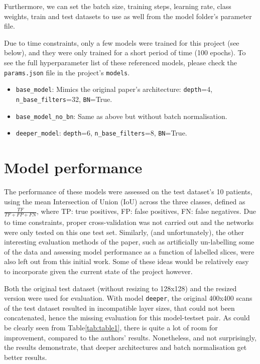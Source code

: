 \documentclass{article}
\begin{document}
Furthermore, we can set the batch size, training steps, learning rate, class weights, train and test datasets to use as well from the model folder's parameter file.

Due to time constraints, only a few models were trained for this project (see below), and they were only trained for a short period of time (100 epochs). To see the full hyperparameter list of these referenced models, please check the \texttt{params.json} file in the project's \texttt{models}. 

\begin{itemize}
	\item \texttt{base\_model}: Mimics the original paper's architecture: \texttt{depth}=4, \texttt{n\_base\_filters}=32, \texttt{BN}=True.
	\item \texttt{base\_model\_no\_bn}: Same as above but without batch normalisation. 
	\item \texttt{deeper\_model}: \texttt{depth}=6, \texttt{n\_base\_filters}=8, \texttt{BN}=True.
\end{itemize}



\section{Model performance}

The performance of these models were assessed on the test dataset's 10 patients, using the mean Intersection of Union (IoU) across the three classes, defined as $\frac{TF}{TF + FP + FN}$, where TP: true positives, FP: false positives, FN: false negatives. Due to  time constraints, proper cross-validation was not carried out and the networks were only tested on this one test set. Similarly, (and unfortunately), the other interesting evaluation methods of the paper, such as artificially un-labelling some of the data and assessing model performance as a function of labelled slices, were also left out from this initial work. Some of these ideas would be relatively easy to incorporate given the current state of the project however.

Both the original test dataset (without resizing to 128x128) and the resized version were used for evaluation. With model \texttt{deeper}, the original 400x400 scans of the test dataset resulted in incompatible layer sizes, that could not been concatenated, hence the missing evaluation for this model-testset pair. As could be clearly seen from Table\ref{tab:table1}, there is quite a lot of room for improvement, compared to the authors' results. Nonetheless, and not surprisingly, the results demonstrate, that deeper architectures and batch normalisation get better results.
\end{document}

